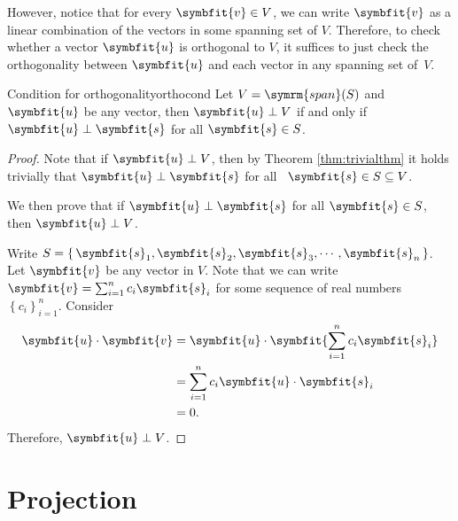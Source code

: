 \documentclass[math]{amznotes}
\theoremstyle{remark}
\begin{document}
However, notice that for every $\symbfit{v} \in V$, we can write $\symbfit{v}$ as a linear combination of the vectors in some spanning set of $V$. Therefore, to check whether a vector $\symbfit{u}$ is orthogonal to $V$, it suffices to just check the orthogonality between $\symbfit{u}$ and each vector in any spanning set of~$V$.
\begin{thmbox}{Condition for orthogonality}{orthocond}
    Let $V = \symrm{span}(S)$ and $\symbfit{u}$ be any vector, then $\symbfit{u} \perp V$ if and only if $\symbfit{u} \perp \symbfit{s}$ for all $\symbfit{s} \in S$.
    \tcblower
    \begin{proof}
        Note that if $\symbfit{u} \perp V$, then by Theorem \ref{thm:trivialthm} it holds trivially that $\symbfit{u} \perp \symbfit{s}$ for all~ $\symbfit{s} \in S \subseteq V$.

        We then prove that if $\symbfit{u} \perp \symbfit{s}$ for all $\symbfit{s} \in S$, then $\symbfit{u} \perp V$.

        Write $S = \left\{\, \symbfit{s}_1, \symbfit{s}_2, \symbfit{s}_3, \cdots, \symbfit{s}_n \,\right\}$. Let $\symbfit{v}$ be any vector in $V$. Note that we can write $\symbfit{v} = \sum_{i = 1}^n c_i \symbfit{s}_i$ for some sequence of real numbers $\left\{c_i\right\}_{i = 1}^n$. Consider
        \begin{align*}
            \symbfit{u} \cdot \symbfit{v} & = \symbfit{u} \cdot \symbfit{\sum_{i = 1}^n c_i \symbfit{s}_i} \\
                                          & = \sum_{i = 1}^n c_i \symbfit{u} \cdot \symbfit{s}_i           \\
                                          & = 0.
        \end{align*}
        Therefore, $\symbfit{u} \perp V$.
    \end{proof}
\end{thmbox}
\section{Projection}
\end{document}
